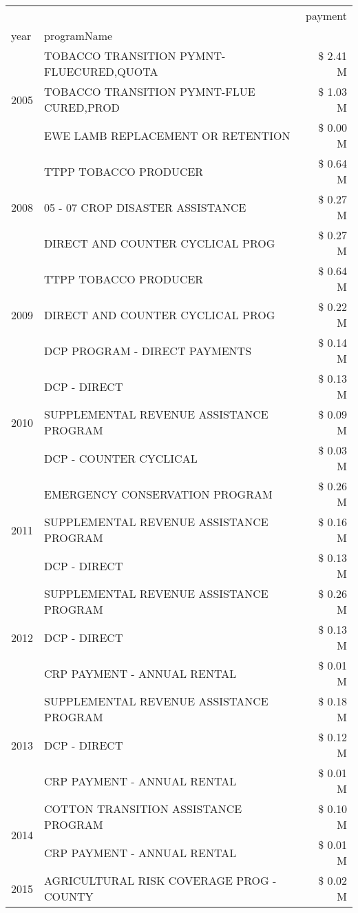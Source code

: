\begin{tabular}{llr}
\toprule
 &  & payment \\
year & programName &  \\
\midrule
\multirow[t]{3}{*}{2005} & TOBACCO TRANSITION PYMNT-FLUECURED,QUOTA & \$ 2.41 M \\
 & TOBACCO TRANSITION PYMNT-FLUE CURED,PROD & \$ 1.03 M \\
 & EWE LAMB REPLACEMENT OR RETENTION & \$ 0.00 M \\
\cline{1-3}
\multirow[t]{3}{*}{2008} & TTPP TOBACCO PRODUCER & \$ 0.64 M \\
 & 05 - 07 CROP DISASTER ASSISTANCE & \$ 0.27 M \\
 & DIRECT AND COUNTER CYCLICAL PROG & \$ 0.27 M \\
\cline{1-3}
\multirow[t]{3}{*}{2009} & TTPP TOBACCO PRODUCER & \$ 0.64 M \\
 & DIRECT AND COUNTER CYCLICAL PROG & \$ 0.22 M \\
 & DCP PROGRAM - DIRECT PAYMENTS & \$ 0.14 M \\
\cline{1-3}
\multirow[t]{3}{*}{2010} & DCP - DIRECT & \$ 0.13 M \\
 & SUPPLEMENTAL REVENUE ASSISTANCE PROGRAM & \$ 0.09 M \\
 & DCP - COUNTER CYCLICAL & \$ 0.03 M \\
\cline{1-3}
\multirow[t]{3}{*}{2011} & EMERGENCY CONSERVATION PROGRAM & \$ 0.26 M \\
 & SUPPLEMENTAL REVENUE ASSISTANCE PROGRAM & \$ 0.16 M \\
 & DCP - DIRECT & \$ 0.13 M \\
\cline{1-3}
\multirow[t]{3}{*}{2012} & SUPPLEMENTAL REVENUE ASSISTANCE PROGRAM & \$ 0.26 M \\
 & DCP - DIRECT & \$ 0.13 M \\
 & CRP PAYMENT - ANNUAL RENTAL & \$ 0.01 M \\
\cline{1-3}
\multirow[t]{3}{*}{2013} & SUPPLEMENTAL REVENUE ASSISTANCE PROGRAM & \$ 0.18 M \\
 & DCP - DIRECT & \$ 0.12 M \\
 & CRP PAYMENT - ANNUAL RENTAL & \$ 0.01 M \\
\cline{1-3}
\multirow[t]{2}{*}{2014} & COTTON TRANSITION ASSISTANCE PROGRAM & \$ 0.10 M \\
 & CRP PAYMENT - ANNUAL RENTAL & \$ 0.01 M \\
\cline{1-3}
\multirow[t]{2}{*}{2015} & AGRICULTURAL RISK COVERAGE PROG - COUNTY & \$ 0.02 M \\

\end{tabular}
